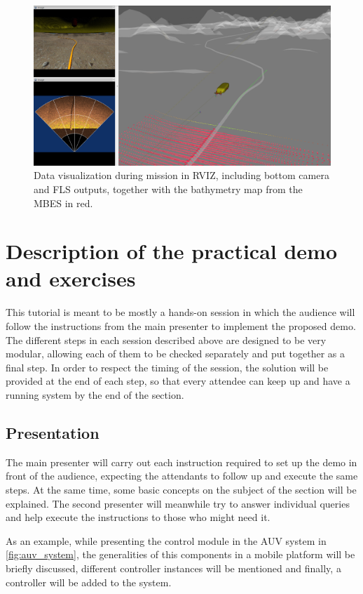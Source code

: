 \documentclass[
10pt, %
a4paper, %
oneside, %
headinclude,footinclude, %
BCOR5mm, %
]{scrartcl}
\begin{document}
\begin{figure}[h]
    \centering
    \includegraphics[width=0.9\linewidth]{Figures/rviz_pipeline.png}
    \caption{Data visualization during mission in RVIZ, including bottom camera and FLS outputs, together with the bathymetry map from the MBES in red.}
\label{fig:lolo_rviz}
\end{figure}

\section{Description of the practical demo and exercises}
\label{sec:demo}
This tutorial is meant to be mostly a hands-on session in which the audience will follow the instructions from the main presenter to implement the proposed demo.
The different steps in each session described above are designed to be very modular, allowing each of them to be checked separately and put together as a final step.
In order to respect the timing of the session, the solution will be provided at the end of each step, so that every attendee can keep up and have a running system by the end of the section.

\subsection{\textbf{Presentation}}
The main presenter will carry out each instruction required to set up the demo in front of the audience, expecting the attendants to follow up and execute the same steps.
At the same time, some basic concepts on the subject of the section will be explained.
The second presenter will meanwhile try to answer individual queries and help execute the instructions to those who might need it.

As an example, while presenting the control module in the AUV system in \ref{fig:auv_system}, the generalities of this components in a mobile platform will be briefly discussed, different controller instances will be mentioned and finally, a controller will be added to the system.
\end{document}
